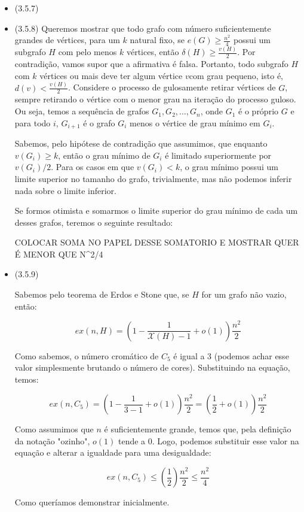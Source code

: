 \documentclass{article}
\begin{document}
\begin{enumerate}
\begin{itemize}
		      \item (3.5.7)
		      \item (3.5.8)
		            Queremos mostrar que todo grafo com número suficientemente grandes de vértices,
		            para um \(k\) natural fixo, se \(e(G) \geq \frac{n^2}{4}\) possui um subgrafo \(H\) com
		            pelo menos \(k\) vértices, então \(\delta(H) \geq \frac{v(H)}{2}\).
		            Por contradição, vamos supor que a afirmativa é falsa. Portanto, todo subgrafo \(H\)
		            com \(k\) vértices ou mais deve ter algum vértice \(v\)com grau pequeno, isto é, \(d(v) < \frac{v(H)}{2}\).
		            Considere o processo de gulosamente retirar vértices de \(G\), sempre retirando o vértice com o menor grau na
		            iteração do processo guloso. Ou seja, temos a sequência de grafos \(G_1, G_2, \dots, G_n\), onde \(G_1\) é o próprio \(G\)
		            e para todo \(i\), \(G_{i+1}\) é o grafo \(G_i\) menos o vértice de grau mínimo em \(G_i\).

		            Sabemos, pelo hipótese de contradição que assumimos, que enquanto \(v(G_i) \geq k\), então o grau mínimo de \(G_i\)
		            é limitado superiormente por \(v(G_i)/2\). Para os casos em que \(v(G_i) < k\), o grau mínimo possui um limite superior
		            no tamanho do grafo, trivialmente, mas não podemos inferir nada sobre o limite inferior.

		            Se formos otimista e somarmos o limite superior do grau mínimo de cada um desses grafos, teremos o seguinte resultado:


		            COLOCAR SOMA NO PAPEL DESSE SOMATORIO E MOSTRAR QUER É MENOR QUE N^2/4
		      \item (3.5.9)

		            Sabemos pelo teorema de Erdos e Stone que, se \(H\) for um grafo não vazio, então:

		            \[ex(n, H) = (1 - \frac{1}{\mathcal{X}(H) - 1} + o(1))\frac{n^2}{2}\]

		            Como sabemos, o número cromático de \(C_5\) é igual a 3 (podemos achar esse valor simplesmente brutando o número de cores). Substituindo na equação, temos:

		            \[ex(n, C_5) = (1 - \frac{1}{3 - 1} + o(1))\frac{n^2}{2} = (\frac{1}{2} + o(1))\frac{n^2}{2}\]

		            Como assumimos que \(n\) é suficientemente grande, temos que, pela definição da notação "ozinho", \(o(1)\) tende a 0. Logo, podemos substituir esse valor na equação e alterar a igualdade para uma desigualdade:

		            \[ex(n, C_5) \leq (\frac{1}{2})\frac{n^2}{2} \leq \frac{n^2}{4}\]

		            Como queríamos demonstrar inicialmente.

	      \end{itemize}
\end{enumerate}
\end{document}
